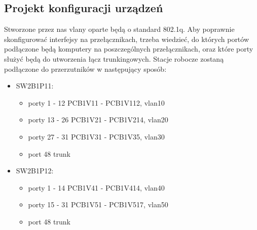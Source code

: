 \documentclass[a4paper, 12pt]{article}
\begin{document}
\subsection{Projekt konfiguracji urządzeń}
Stworzone przez nas vlany oparte będą o standard 802.1q. Aby poprawnie skonfigurować interfejsy na przełącznikach, trzeba wiedzieć, do których portów podłączone będą komputery na poszczególnych przełącznikach, oraz które porty służyć będą do utworzenia łącz trunkingowych. Stacje robocze zostaną podłączone do przerzutników w następujący sposób:

\begin{itemize}
\item SW2B1P11:
	\begin{itemize}
	\item porty 1 - 12 PCB1V11 - PCB1V112, vlan10 
	\item porty 13 - 26 PCB1V21 - PCB1V214, vlan20
	\item porty 27 - 31 PCB1V31 - PCB1V35, vlan30
	\item port 48 trunk
	\end{itemize}
\item SW2B1P12:
	\begin{itemize}
	\item porty 1 - 14 PCB1V41 - PCB1V414, vlan40
	\item porty 15 - 31 PCB1V51 - PCB1V517, vlan50
	\item port 48 trunk
	\end{itemize}
	

\end{itemize}
\end{document}
